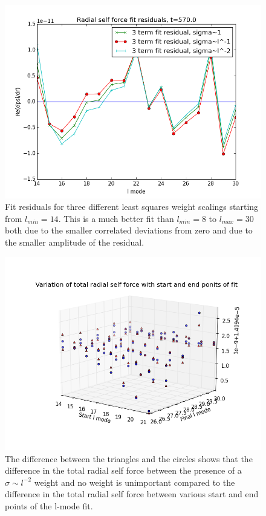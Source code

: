 \begin{figure}
\includegraphics{fitresidulas3terms570l14}
\caption{Fit residuals for three different least squares weight scalings starting from $l_{min}=14$. This is a much better fit than $l_{min}=8$ to $l_{max}=30$ both due to the smaller correlated deviations from zero and due to the smaller amplitude of the residual.}
\label{14goodfit}
\end{figure}

\begin{figure}
  \includegraphics{3Dscatterwithwithoutsigmalminlmax}
  \caption{The difference between the triangles and the circles shows that the difference in the total radial self force between the presence of a $\sigma\sim l^{-2}$ weight and no weight is unimportant compared to the difference in the total radial self force between various start and end points of the l-mode fit.}
  \label{scatterfig}
\end{figure}


